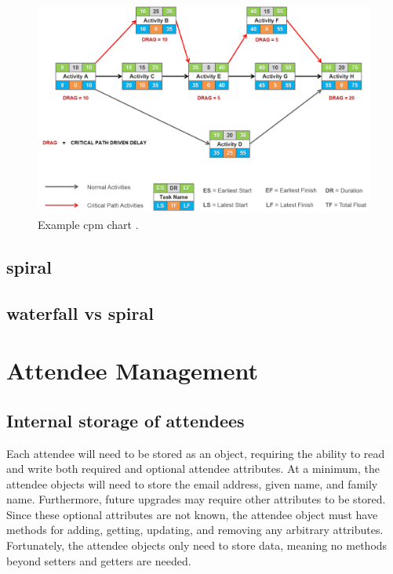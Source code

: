 \documentclass[11pt]{article}
\begin{document}
\begin{figure}[h!]
    \centering
    \includegraphics[width=\textwidth]{figures/cpm.png}
    \caption{Example \acrshort{cpm} chart \cite{cpm}.}
    \label{fig:cpm-chart}
\end{figure}

\subsection{\Gls{spiral}}



\subsection{\Gls{waterfall} vs \Gls{spiral}}



\newpage

\section{Attendee Management}

\subsection{Internal storage of attendees}

Each attendee will need to be stored as an \gls{object}, requiring the ability to read and write both required and optional attendee attributes. At a minimum, the attendee \glspl{object} will need to store the email address, given name, and family name. Furthermore, future upgrades may require other attributes to be stored. Since these optional attributes are not known, the attendee \gls{object} must have methods for adding, getting, updating, and removing any arbitrary attributes. Fortunately, the attendee \glspl{object} only need to store data, meaning no methods beyond setters and getters are needed.
\end{document}
